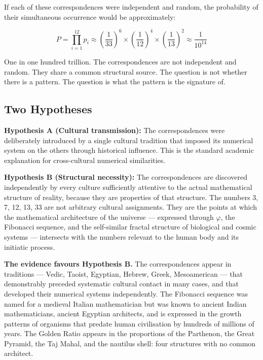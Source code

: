 \documentclass[12pt, a4paper]{article}
\begin{document}
If each of these correspondences were independent and random, the probability
of their simultaneous occurrence would be approximately:

\begin{equation}
P = \prod_{i=1}^{12} p_i \approx \left(\frac{1}{33}\right)^6 \times
\left(\frac{1}{12}\right)^4 \times \left(\frac{1}{13}\right)^2 \approx
\frac{1}{10^{14}}
\end{equation}

One in one hundred trillion. The correspondences are not independent and
random. They share a common structural source. The question is not whether
there is a pattern. The question is what the pattern is the signature of.

\subsection{Two Hypotheses}

\textbf{Hypothesis A (Cultural transmission):} The correspondences were
deliberately introduced by a single cultural tradition that imposed its
numerical system on the others through historical influence. This is the
standard academic explanation for cross-cultural numerical similarities.

\textbf{Hypothesis B (Structural necessity):} The correspondences are
discovered independently by every culture sufficiently attentive to the actual
mathematical structure of reality, because they are properties of that
structure. The numbers 3, 7, 12, 13, 33 are not arbitrary cultural assignments.
They are the points at which the mathematical architecture of the universe —
expressed through $\varphi$, the Fibonacci sequence, and the self-similar
fractal structure of biological and cosmic systems — intersects with the
numbers relevant to the human body and its initiatic process.

\textbf{The evidence favours Hypothesis B.} The correspondences appear in
traditions — Vedic, Taoist, Egyptian, Hebrew, Greek, Mesoamerican — that
demonstrably preceded systematic cultural contact in many cases, and that
developed their numerical systems independently. The Fibonacci sequence was
named for a medieval Italian mathematician but was known to ancient Indian
mathematicians, ancient Egyptian architects, and is expressed in the growth
patterns of organisms that predate human civilisation by hundreds of millions
of years. The Golden Ratio appears in the proportions of the Parthenon, the
Great Pyramid, the Taj Mahal, and the nautilus shell: four structures with no
common architect.
\end{document}
